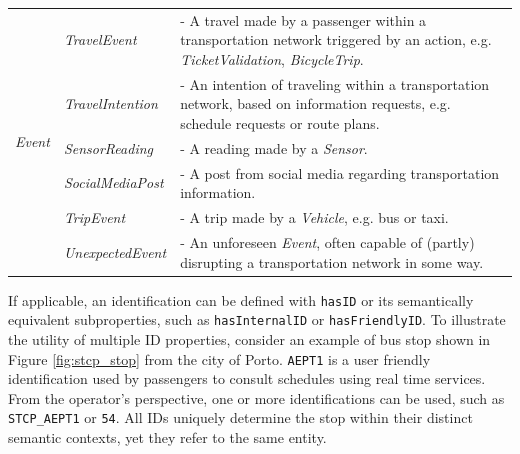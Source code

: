 \documentclass[]{interact}
\theoremstyle{plain}%
\theoremstyle{definition}
\theoremstyle{remark}
\theoremstyle{definition}
\begin{document}
\begin{table}
\begin{tabular}{c|l|p{12cm}}
    \hline
    \multirow{8}{*}{\textit{Event}}	&	\textit{TravelEvent}	& - A travel made by a passenger within a transportation network triggered by an action, e.g. \textit{TicketValidation}, \textit{BicycleTrip}.\\
    	&	\textit{TravelIntention}	& - An intention of traveling within a transportation network, based on information requests, e.g. schedule requests or route plans. \\
    	&	\textit{SensorReading}		& - A reading made by a \textit{Sensor}. \\
    	&	\textit{SocialMediaPost}	& - A post from social media regarding transportation information. \\
    	&	\textit{TripEvent}	&	- A trip made by a \textit{Vehicle}, e.g. bus or taxi. \\
    	&	\textit{UnexpectedEvent}	& - An unforeseen \textit{Event}, often capable of (partly) disrupting a transportation network in some way. \\

    \bottomrule
\end{tabular}
\end{table}

%
%

If applicable, an identification can be defined with \texttt{hasID} or its semantically equivalent subproperties, such as \texttt{hasInternalID} or \texttt{hasFriendlyID}. To illustrate the utility of multiple ID properties, consider an example of bus stop shown in Figure \ref{fig:stcp_stop} from the city of Porto. \texttt{AEPT1} is a user friendly identification used by passengers to consult schedules using real time services. From the operator's perspective, one or more identifications can be used, such as \texttt{STCP\_AEPT1} or \texttt{54}. All IDs uniquely determine the stop within their distinct semantic contexts, yet they refer to the same entity.
\end{document}
